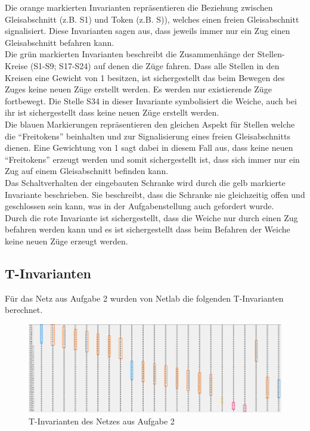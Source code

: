 \documentclass[10pt]{scrartcl}
\begin{document}
Die orange markierten Invarianten repräsentieren die Beziehung zwischen Gleisabschnitt (z.B. S1) und Token (z.B. S)), welches einen freien Gleisabschnitt signalisiert.
Diese Invarianten sagen aus, dass jeweils immer nur ein Zug einen Gleisabschnitt befahren kann.\\

Die grün markierten Invarianten beschreibt die Zusammenhänge der Stellen-Kreise (S1-S9; S17-S24) auf denen die Züge fahren.
Dass alle Stellen in den Kreisen eine Gewicht von 1 besitzen, ist sichergestellt das beim Bewegen des Zuges keine neuen Züge erstellt werden.
Es werden nur existierende Züge fortbewegt.
Die Stelle S34 in dieser Invariante symbolisiert die Weiche, auch bei ihr ist sichergestellt dass keine neuen Züge erstellt werden.\\
  
Die blauen Markierungen repräsentieren den gleichen Aspekt für Stellen welche die "`Freitokens"' beinhalten und zur Signalisierung eines freien Gleisabschnitts dienen.
Eine Gewichtung von 1 sagt dabei in diesem Fall aus, dass keine neuen "`Freitokens"' erzeugt werden und somit sichergestellt ist, dass sich immer nur ein Zug auf einem Gleisabschnitt befinden kann.\\

Das Schaltverhalten der eingebauten Schranke wird durch die gelb markierte Invariante beschrieben.
Sie beschreibt, dass die Schranke nie gleichzeitig offen und geschlossen sein kann, was in der Aufgabenstellung auch gefordert wurde.\\

Durch die rote Invariante ist sichergestellt, dass die Weiche nur durch einen Zug befahren werden kann und es ist sichergestellt dass beim Befahren der Weiche keine neuen Züge erzeugt werden.

\subsection{T-Invarianten}
Für das Netz aus Aufgabe 2 wurden von Netlab die folgenden T-Invarianten berechnet.

\begin{figure}[htbp]
	\centering	\includegraphics[width=1.0\textwidth]{Bilder/t_invarianten.png}
	\caption{T-Invarianten des Netzes aus Aufgabe 2}
	\label{fig:T_invarianten}
\end{figure}
\end{document}
